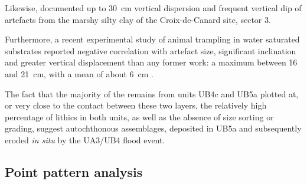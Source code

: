 \documentclass[preprint,authoryear,times]{elsarticle} %
\begin{document}
Likewise, \cite{Lenoble2004} documented up to 30~cm vertical dispersion and frequent vertical dip of artefacts from the marshy silty clay of the Croix-de-Canard site, sector 3.

Furthermore, a recent experimental study of animal trampling in water saturated substrates reported negative correlation with artefact size, significant inclination and greater vertical displacement than any former work: a maximum between 16 and 21~cm, with a mean of about 6~cm \citep{Eren2010}.

The fact that the majority of the remains from units UB4c and UB5a plotted at, or very close to the contact between these two layers, the relatively high percentage of lithics in both units, as well as the absence of size sorting or grading, suggest autochthonous assemblages, deposited in UB5a and subsequently eroded \emph{in situ} by the UA3/UB4 flood event.


\subsection{Point pattern analysis}



\end{document}

